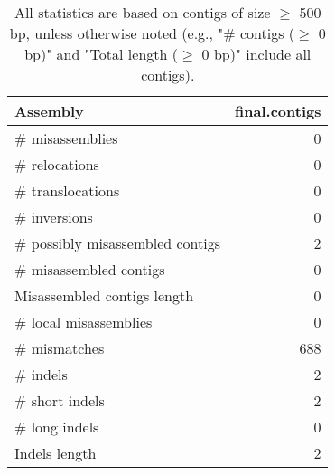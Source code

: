 \documentclass[12pt,a4paper]{article}
\begin{document}
\begin{table}[ht]
\begin{center}
\caption{All statistics are based on contigs of size $\geq$ 500 bp, unless otherwise noted (e.g., "\# contigs ($\geq$ 0 bp)" and "Total length ($\geq$ 0 bp)" include all contigs).}
\begin{tabular}{|l*{1}{|r}|}
\hline
Assembly & final.contigs \\ \hline
\# misassemblies & 0 \\ \hline
\hspace{5mm}\# relocations & 0 \\ \hline
\hspace{5mm}\# translocations & 0 \\ \hline
\hspace{5mm}\# inversions & 0 \\ \hline
\# possibly misassembled contigs & 2 \\ \hline
\# misassembled contigs & 0 \\ \hline
Misassembled contigs length & 0 \\ \hline
\# local misassemblies & 0 \\ \hline
\# mismatches & 688 \\ \hline
\# indels & 2 \\ \hline
\hspace{5mm}\# short indels & 2 \\ \hline
\hspace{5mm}\# long indels & 0 \\ \hline
Indels length & 2 \\ \hline
\end{tabular}
\end{center}
\end{table}
\end{document}
